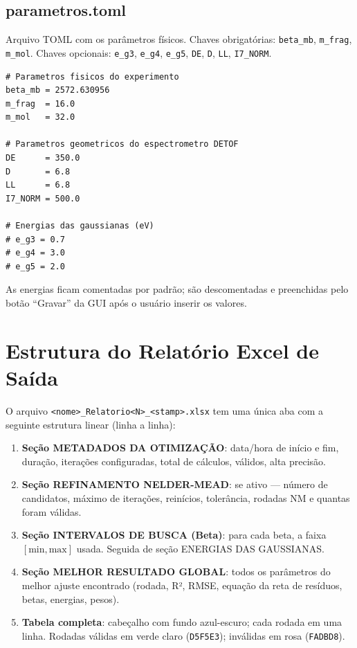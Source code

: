 \documentclass[12pt,a4paper]{report}
\newcommand{\code}[1]{\texttt{#1}}
\begin{document}
\subsection{parametros.toml}

Arquivo TOML com os parâmetros físicos. Chaves obrigatórias:
\code{beta\_mb}, \code{m\_frag}, \code{m\_mol}. Chaves opcionais:
\code{e\_g3}, \code{e\_g4}, \code{e\_g5}, \code{DE}, \code{D},
\code{LL}, \code{I7\_NORM}.

\begin{lstlisting}[language={},caption={Exemplo de parametros.toml}]
# Parametros fisicos do experimento
beta_mb = 2572.630956
m_frag  = 16.0
m_mol   = 32.0

# Parametros geometricos do espectrometro DETOF
DE      = 350.0
D       = 6.8
LL      = 6.8
I7_NORM = 500.0

# Energias das gaussianas (eV)
# e_g3 = 0.7
# e_g4 = 3.0
# e_g5 = 2.0
\end{lstlisting}

As energias ficam comentadas por padrão; são descomentadas e preenchidas
pelo botão ``Gravar'' da GUI após o usuário inserir os valores.

\section{Estrutura do Relatório Excel de Saída}

O arquivo \texttt{<nome>\_Relatorio<N>\_<stamp>.xlsx} tem uma única aba
com a seguinte estrutura linear (linha a linha):

\begin{enumerate}
  \item \textbf{Seção METADADOS DA OTIMIZAÇÃO}: data/hora de início e fim,
    duração, iterações configuradas, total de cálculos, válidos, alta precisão.

  \item \textbf{Seção REFINAMENTO NELDER-MEAD}: se ativo — número de
    candidatos, máximo de iterações, reinícios, tolerância, rodadas NM
    e quantas foram válidas.

  \item \textbf{Seção INTERVALOS DE BUSCA (Beta)}: para cada beta, a faixa
    $[\text{min}, \text{max}]$ usada. Seguida de seção ENERGIAS DAS GAUSSIANAS.

  \item \textbf{Seção MELHOR RESULTADO GLOBAL}: todos os parâmetros do melhor
    ajuste encontrado (rodada, R², RMSE, equação da reta de resíduos, betas,
    energias, pesos).

  \item \textbf{Tabela completa}: cabeçalho com fundo azul-escuro; cada rodada
    em uma linha. Rodadas válidas em verde claro (\texttt{D5F5E3}); inválidas
    em rosa (\texttt{FADBD8}).
\end{enumerate}
\end{document}
